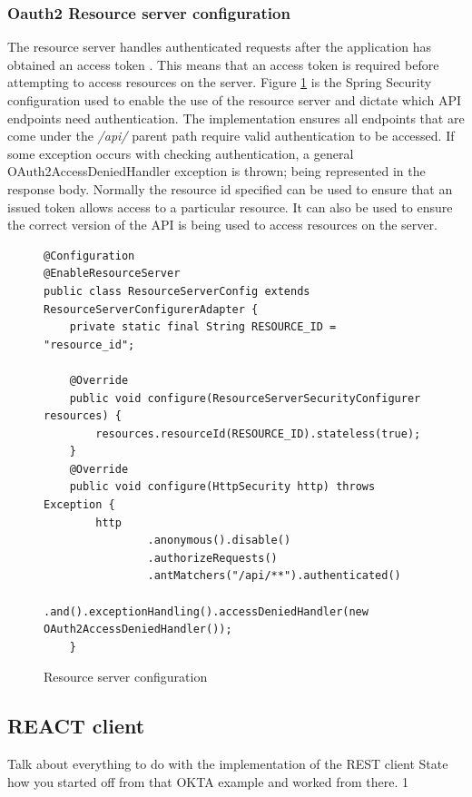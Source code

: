 \clearpage
\subsubsection{Oauth2 Resource server configuration}
The resource server handles authenticated requests after the application has obtained an access token \cite{oauth2016resourceserver}.
This means that an access token is required before attempting to access resources on the server.
Figure \ref{resourceserverconfig} is the Spring Security configuration used to enable the use of the resource server and dictate which 
API endpoints need authentication.
The implementation ensures all endpoints that are come under the \textit{/api/} parent path require valid authentication to be accessed.
If some exception occurs with checking authentication, a general OAuth2AccessDeniedHandler exception is thrown; being represented in the
response body.
Normally the resource id specified can be used to ensure that an issued token allows access to a particular resource.
It can also be used to ensure the correct version of the API is being used to access resources on the server.


\begin{figure}[ht]
    \centering
    \begin{lstlisting}
@Configuration
@EnableResourceServer
public class ResourceServerConfig extends ResourceServerConfigurerAdapter {
    private static final String RESOURCE_ID = "resource_id";

    @Override
    public void configure(ResourceServerSecurityConfigurer resources) {
        resources.resourceId(RESOURCE_ID).stateless(true);
    }
    @Override
    public void configure(HttpSecurity http) throws Exception {
        http
                .anonymous().disable()
                .authorizeRequests()
                .antMatchers("/api/**").authenticated()
                .and().exceptionHandling().accessDeniedHandler(new OAuth2AccessDeniedHandler());
    } 
    \end{lstlisting}
    \caption{Resource server configuration}
    \label{resourceserverconfig}
\end{figure}




\subsection{REACT client}
Talk about everything to do with the implementation of the REST client
State how you started off from that OKTA example and worked from there. 
1